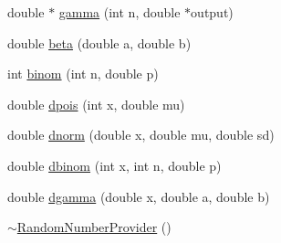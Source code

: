 \begin{DoxyCompactItemize}
\item 
double $\ast$ \hyperlink{classSpatialSEIR_1_1RandomNumberProvider_a6feb3011c6f971bb6c81f8dd6c7d367a}{gamma} (int n, double $\ast$output)
\item 
double \hyperlink{classSpatialSEIR_1_1RandomNumberProvider_a64765af82773b956f7eea2ef65a797ff}{beta} (double a, double b)
\item 
int \hyperlink{classSpatialSEIR_1_1RandomNumberProvider_a87636aaa1de36985a64c04a1c486efd6}{binom} (int n, double p)
\item 
double \hyperlink{classSpatialSEIR_1_1RandomNumberProvider_a786ecbfbe1c14cf243ca0f0ae3f4a25c}{dpois} (int x, double mu)
\item 
double \hyperlink{classSpatialSEIR_1_1RandomNumberProvider_a310de2268d36eaa51b33317cad9b2cdd}{dnorm} (double x, double mu, double sd)
\item 
double \hyperlink{classSpatialSEIR_1_1RandomNumberProvider_a2dd3f589c4aacc87d501f9ed56ea58bd}{dbinom} (int x, int n, double p)
\item 
double \hyperlink{classSpatialSEIR_1_1RandomNumberProvider_afb8ae97e0047da467c180ccde95b394e}{dgamma} (double x, double a, double b)
\item 
\hyperlink{classSpatialSEIR_1_1RandomNumberProvider_a5f96e9525ec0deec884ab2dcaceea1d1}{$\sim$\-Random\-Number\-Provider} ()
\end{DoxyCompactItemize}


